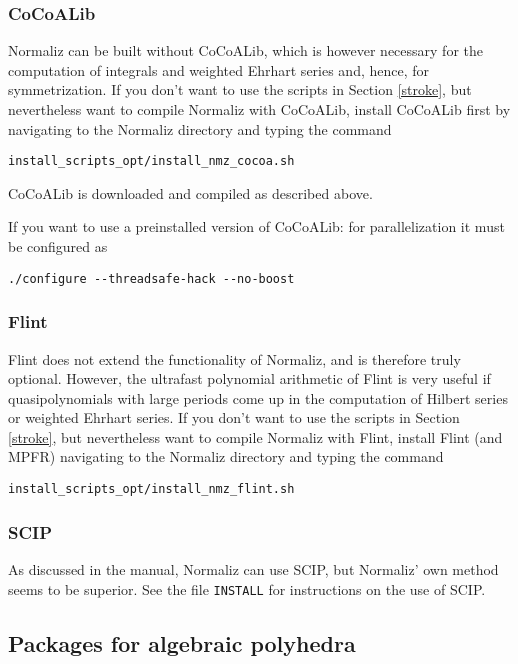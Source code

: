 \documentclass[12pt,a4paper]{scrartcl}
\theoremstyle{definition}
\begin{document}
\subsubsection{CoCoALib}

Normaliz can be built without CoCoALib, which is however necessary for the computation of integrals and weighted Ehrhart series and, hence,  for symmetrization. If you don't want to use the scripts in Section \ref{stroke}, but nevertheless want to compile Normaliz with CoCoALib, install  CoCoALib first by navigating to the Normaliz directory and typing the command
\begin{Verbatim}
install_scripts_opt/install_nmz_cocoa.sh
\end{Verbatim}
CoCoALib is downloaded and compiled as described above.

If you want to use a preinstalled version of CoCoALib: for parallelization  it must be configured as
\begin{Verbatim}
./configure --threadsafe-hack --no-boost 
\end{Verbatim}

\subsubsection{Flint}

Flint does not extend the functionality of Normaliz, and is therefore truly optional.
However, the ultrafast polynomial arithmetic of Flint is very useful if quasipolynomials with large periods come up in the computation of Hilbert series or weighted Ehrhart series. If you don't want to use the scripts in Section \ref{stroke}, but nevertheless want to compile Normaliz with Flint,  install Flint (and MPFR) navigating to the Normaliz directory and typing the command
\begin{Verbatim}
install_scripts_opt/install_nmz_flint.sh
\end{Verbatim}

\subsubsection{SCIP}

As discussed in the manual, Normaliz can use SCIP, but Normaliz' own method seems to be superior. See the file \verb|INSTALL|  for instructions on the use of SCIP.
 
\subsection{Packages for algebraic polyhedra}
\end{document}
